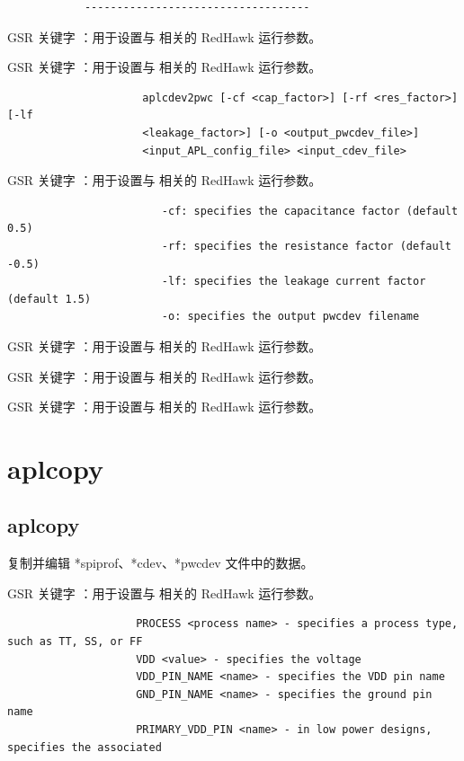 \begin{lstlisting}
            -----------------------------------
\end{lstlisting}

GSR 关键字 ：用于设置与  相关的 RedHawk 运行参数。

GSR 关键字 ：用于设置与  相关的 RedHawk 运行参数。

\begin{lstlisting}
                     aplcdev2pwc [-cf <cap_factor>] [-rf <res_factor>] [-lf
                     <leakage_factor>] [-o <output_pwcdev_file>]
                     <input_APL_config_file> <input_cdev_file>
\end{lstlisting}

GSR 关键字 ：用于设置与  相关的 RedHawk 运行参数。

\begin{lstlisting}
                        -cf: specifies the capacitance factor (default 0.5)
                        -rf: specifies the resistance factor (default -0.5)
                        -lf: specifies the leakage current factor (default 1.5)
                        -o: specifies the output pwcdev filename
\end{lstlisting}

GSR 关键字 ：用于设置与  相关的 RedHawk 运行参数。

GSR 关键字 ：用于设置与  相关的 RedHawk 运行参数。

GSR 关键字 ：用于设置与  相关的 RedHawk 运行参数。

\section{aplcopy}
\subsection*{aplcopy}

复制并编辑 *spiprof、*cdev、*pwcdev 文件中的数据。

GSR 关键字 ：用于设置与  相关的 RedHawk 运行参数。

\begin{lstlisting}
                    PROCESS <process name> - specifies a process type, such as TT, SS, or FF
                    VDD <value> - specifies the voltage
                    VDD_PIN_NAME <name> - specifies the VDD pin name
                    GND_PIN_NAME <name> - specifies the ground pin name
                    PRIMARY_VDD_PIN <name> - in low power designs, specifies the associated
\end{lstlisting}

